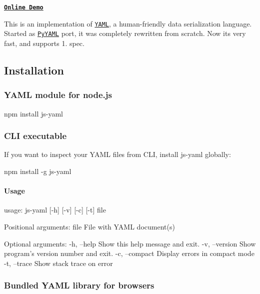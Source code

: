 \href{https://travis-ci.org/nodeca/js-yaml}{\tt } \href{https://www.npmjs.org/package/js-yaml}{\tt }

{\bfseries \href{http://nodeca.github.com/js-yaml/}{\tt Online Demo}}

This is an implementation of \href{http://yaml.org/}{\tt Y\+A\+ML}, a human-\/friendly data serialization language. Started as \href{http://pyyaml.org/}{\tt Py\+Y\+A\+ML} port, it was completely rewritten from scratch. Now it\textquotesingle{}s very fast, and supports 1. spec.

\subsection*{Installation }

\subsubsection*{Y\+A\+ML module for node.\+js}


\begin{DoxyCode}
npm install js-yaml
\end{DoxyCode}


\subsubsection*{C\+LI executable}

If you want to inspect your Y\+A\+ML files from C\+LI, install js-\/yaml globally\+:


\begin{DoxyCode}
npm install -g js-yaml
\end{DoxyCode}


\paragraph*{Usage}


\begin{DoxyCode}
usage: js-yaml [-h] [-v] [-c] [-t] file

Positional arguments:
  file           File with YAML document(s)

Optional arguments:
  -h, --help     Show this help message and exit.
  -v, --version  Show program's version number and exit.
  -c, --compact  Display errors in compact mode
  -t, --trace    Show stack trace on error
\end{DoxyCode}


\subsubsection*{Bundled Y\+A\+ML library for browsers}


